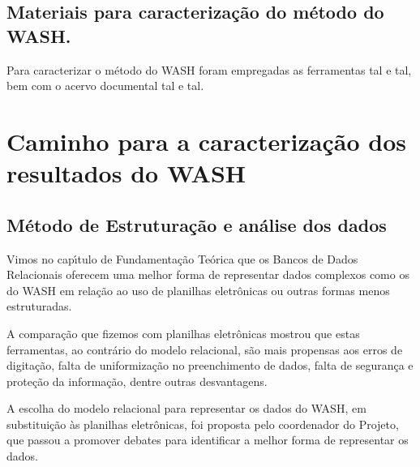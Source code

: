 \documentclass[
12pt,		%
openright,	%
twoside,  %
a4paper,			%
chapter=TITLE,		%
english,			%
french,				%
spanish,			%
brazil				%
]{USPSC-classe/USPSC_RedarTex}
\begin{document}
\subsection[Materiais para caracteriza\c{c}\~ao do m\'etodo do WASH.]{Materiais para caracteriza\c{c}\~ao do m\'etodo do WASH.}\label{Materiais para caracteriza\c{c}\~ao do m\'etodo do WASH.}
Para caracterizar o m\'etodo do WASH foram empregadas as ferramentas tal e tal, bem com o acervo documental tal e tal.








\section[Caminho para a caracteriza\c{c}\~ao dos resultados do WASH]{Caminho para a caracteriza\c{c}\~ao dos resultados do WASH}\label{Caminho para a caracteriza\c{c}\~ao dos resultados do WASH}
\subsection[M\'etodo de Estrutura\c{c}\~ao e an\'alise dos dados]{M\'etodo de Estrutura\c{c}\~ao e an\'alise dos dados}\label{M\'etodo de Estrutura\c{c}\~ao e an\'alise dos dados}
Vimos no cap\'{\i}tulo de Fundamenta\c{c}\~ao Te\'orica que os Bancos de Dados Relacionais oferecem uma melhor forma de representar dados complexos como os do WASH em rela\c{c}\~ao ao uso de planilhas eletr\^onicas ou outras formas menos estruturadas.








A compara\c{c}\~ao que fizemos com planilhas eletr\^onicas mostrou que estas ferramentas, ao contr\'ario do modelo relacional, s\~ao mais propensas aos erros de digita\c{c}\~ao, falta de uniformiza\c{c}\~ao no preenchimento de dados, falta de seguran\c{c}a e prote\c{c}\~ao da informa\c{c}\~ao, dentre outras desvantagens.








A escolha do modelo relacional para representar os dados do WASH, em substitui\c{c}\~ao \`as planilhas eletr\^onicas, foi proposta pelo coordenador do Projeto, que passou a promover debates para identificar a melhor forma de representar os dados.
\end{document}
